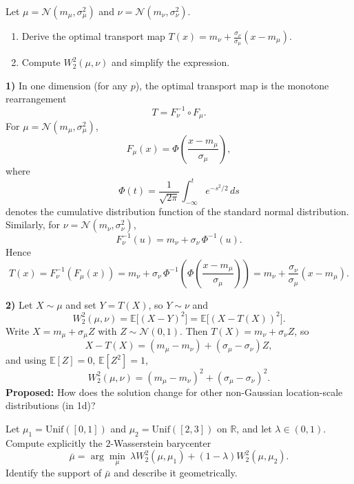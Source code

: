 \begin{exercise}
Let \(\mu=\mathcal{N}(m_\mu,\sigma_\mu^2)\) and \(\nu=\mathcal{N}(m_\nu,\sigma_\nu^2)\).
\begin{enumerate}
\item Derive the optimal transport map \(T(x)=m_\nu+\frac{\sigma_\nu}{\sigma_\mu}(x-m_\mu)\).
\item Compute \(W_2^2(\mu,\nu)\) and simplify the expression.
\end{enumerate}
\end{exercise}

\begin{solution}
\textbf{1)} In one dimension (for any $p$), the optimal transport map is the monotone rearrangement
\[
T = F_\nu^{-1}\circ F_\mu.
\]
For $\mu=\mathcal N(m_\mu,\sigma_\mu^2)$,
\[
F_\mu(x)=\Phi\!\left(\frac{x-m_\mu}{\sigma_\mu}\right),
\]
where
\[
\Phi(t)=\frac{1}{\sqrt{2\pi}}\int_{-\infty}^t e^{-s^2/2}\,ds
\]
denotes the cumulative distribution function of the standard normal distribution.
Similarly, for $\nu=\mathcal N(m_\nu,\sigma_\nu^2)$,
\[
F_\nu^{-1}(u)=m_\nu+\sigma_\nu\,\Phi^{-1}(u).
\]
Hence
\[
T(x)=F_\nu^{-1}(F_\mu(x))
= m_\nu+\sigma_\nu\,\Phi^{-1}\!\left(\Phi\!\left(\frac{x-m_\mu}{\sigma_\mu}\right)\right)
= m_\nu+\frac{\sigma_\nu}{\sigma_\mu}(x-m_\mu).
\]

\textbf{2)} Let $X\sim\mu$ and set $Y=T(X)$, so $Y\sim\nu$ and
\[
W_2^2(\mu,\nu)=\mathbb E\big[(X-Y)^2\big]=\mathbb E\big[(X-T(X))^2\big].
\]
Write $X=m_\mu+\sigma_\mu Z$ with $Z\sim\mathcal N(0,1)$. Then $T(X)=m_\nu+\sigma_\nu Z$, so
\[
X-T(X)=(m_\mu-m_\nu)+(\sigma_\mu-\sigma_\nu)Z,
\]
and using $\mathbb E[Z]=0$, $\mathbb E[Z^2]=1$,
\[
W_2^2(\mu,\nu)=(m_\mu-m_\nu)^2+(\sigma_\mu-\sigma_\nu)^2.
\]
\textbf{Proposed:} How does the solution change for other non-Gaussian location-scale distributions (in 1d)?
\end{solution}





\begin{exercise}
Let $\mu_1=\mathrm{Unif}([0,1])$ and $\mu_2=\mathrm{Unif}([2,3])$ on $\mathbb{R}$, and let
$\lambda\in(0,1)$.
Compute explicitly the $2$-Wasserstein barycenter
\[
\bar\mu=\arg\min_\mu \ \lambda W_2^2(\mu,\mu_1)+(1-\lambda)W_2^2(\mu,\mu_2).
\]
Identify the support of $\bar\mu$ and describe it geometrically.
\end{exercise}


